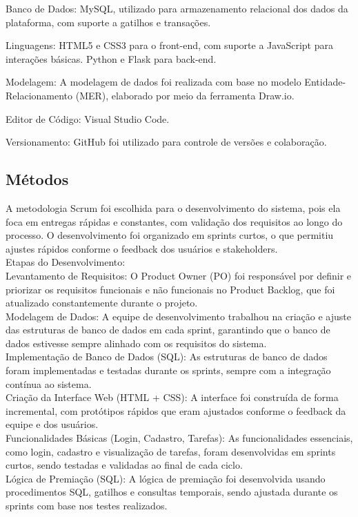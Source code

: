 \documentclass[
	article,			%
	12pt,				%
	oneside,			%
	a4paper,			%
	english,			%
	brazil,				%
	sumario=tradicional
	]{abntex2}
\begin{document}
Banco de Dados: MySQL, utilizado para armazenamento relacional dos dados da plataforma, com suporte a gatilhos e transações.

Linguagens: HTML5 e CSS3 para o front-end, com suporte a JavaScript para interações básicas. Python e Flask para back-end.

Modelagem: A modelagem de dados foi realizada com base no modelo Entidade-Relacionamento (MER), elaborado por meio da ferramenta Draw.io.

Editor de Código: Visual Studio Code.

Versionamento: GitHub foi utilizado para controle de versões e colaboração.


\subsection{Métodos}
A metodologia Scrum foi escolhida para o desenvolvimento do sistema, pois ela foca em entregas rápidas e constantes, com validação dos requisitos ao longo do processo. O desenvolvimento foi organizado em sprints curtos, o que permitiu ajustes rápidos conforme o feedback dos usuários e stakeholders.\\
Etapas do Desenvolvimento:\\
Levantamento de Requisitos: O Product Owner (PO) foi responsável por definir e priorizar os requisitos funcionais e não funcionais no Product Backlog, que foi atualizado constantemente durante o projeto.\\
Modelagem de Dados: A equipe de desenvolvimento trabalhou na criação e ajuste das estruturas de banco de dados em cada sprint, garantindo que o banco de dados estivesse sempre alinhado com os requisitos do sistema.\\
Implementação de Banco de Dados (SQL): As estruturas de banco de dados foram implementadas e testadas durante os sprints, sempre com a integração contínua ao sistema.\\
Criação da Interface Web (HTML + CSS): A interface foi construída de forma incremental, com protótipos rápidos que eram ajustados conforme o feedback da equipe e dos usuários.\\
Funcionalidades Básicas (Login, Cadastro, Tarefas): As funcionalidades essenciais, como login, cadastro e visualização de tarefas, foram desenvolvidas em sprints curtos, sendo testadas e validadas ao final de cada ciclo.\\
Lógica de Premiação (SQL): A lógica de premiação foi desenvolvida usando procedimentos SQL, gatilhos e consultas temporais, sendo ajustada durante os sprints com base nos testes realizados.\\
\end{document}
